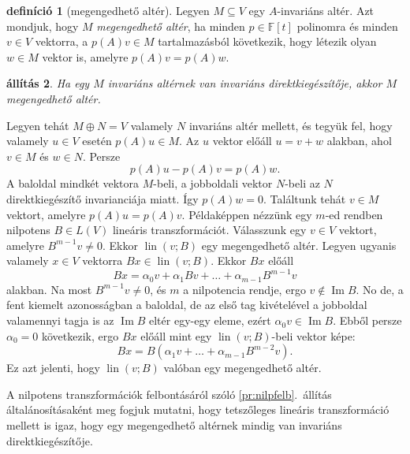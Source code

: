 \documentclass[a4paper, showtrims]{memoir}
\makeatletter
\renewenvironment{proof}[1][\proofname]
    {\par\pushQED{\qed}%
    \normalfont \topsep6\p@\@plus6\p@\relax
    \trivlist
    \item[\hskip\labelsep
        \itshape
    #1\@addpunct{:}]\ignorespaces}
    {\popQED\endtrivlist\@endpefalse}
\theoremstyle{plain}
\newtheorem{proposition}{állítás}[chapter]
\theoremstyle{remark}
\theoremstyle{definition}
\newtheorem{definition}[proposition]{definíció}
\DeclareMathOperator{\lin}{lin}
\DeclareMathOperator{\im}{Im}
\makeatother
\begin{document}
\begin{definition}[megengedhető altér]
    Legyen $M\subseteq V$ egy $A$-invariáns altér.
    Azt mondjuk, hogy $M$ \emph{megengedhető altér},
    ha minden $p\in\mathbb{F}\left[ t \right]$ polinomra és minden $v\in V$ vektorra,
    a $p\left( A \right)v\in M$ tartalmazásból következik, 
    hogy létezik olyan $w\in M$ vektor is, amelyre $p\left( A \right)v=p\left( A \right)w$.
\end{definition}
\begin{proposition}
    Ha egy $M$ invariáns altérnek van invariáns direktkiegészítője, akkor $M$ megengedhető altér.
\end{proposition}
\begin{proof}
    Legyen tehát $M\oplus N=V$ valamely $N$ invariáns altér mellett,
    és tegyük fel, hogy valamely $u\in V$ esetén $p\left( A \right)u\in M$.
    Az $u$ vektor előáll $u=v+w$ alakban, 
    ahol $v\in M$ és $w\in N$.
    Persze
    \[
        p\left( A \right)u-p\left( A \right)v=p\left( A \right)w.
    \]
    A baloldal mindkét vektora $M$-beli, 
    a jobboldali vektor $N$-beli az $N$ direktkiegészítő invarianciája miatt.
    Így $p\left( A \right)w=0$.
    Találtunk tehát $v\in M$ vektort, amelyre $p\left( A \right)u=p\left( A \right)v$.
\end{proof}
Példaképpen nézzünk egy $m$-ed rendben nilpotens 
$B\in L\left( V \right)$ lineáris transzformációt.
Válasszunk egy $v\in V$ vektort, amelyre $B^{m-1}v\neq 0$.
Ekkor $\lin\left( v;B \right)$ egy megengedhető altér.
Legyen ugyanis valamely $x\in V$ vektorra $Bx\in\lin\left( v;B \right)$.
Ekkor $Bx$ előáll
\[
    Bx
    =
    \alpha_0v+\alpha_1Bv+\ldots+\alpha_{m-1}B^{m-1}v
\]
alakban. 
Na most $B^{m-1}v\neq 0$, és $m$ a nilpotencia rendje, ergo $v\notin \im B$. 
No de, a fent kiemelt azonosságban a baloldal,
de az első tag kivételével a jobboldal valamennyi tagja is az $\im B$ eltér egy-egy eleme,
ezért $\alpha_0 v\in\im B$. 
Ebből persze $\alpha_0=0$ következik, 
ergo $Bx$ előáll mint egy $\lin\left( v;B \right)$-beli vektor képe:
\[
    Bx
    =B
    \left( 
    \alpha_1v+\ldots+\alpha_{m-1}B^{m-2}v
    \right).
\]
Ez azt jelenti, hogy $\lin\left(v;B  \right)$ valóban egy megengedhető altér.

A nilpotens transzformációk felbontásáról szóló \ref{pr:nilpfelb}.~állítás általánosításaként meg fogjuk mutatni,
hogy tetszőleges lineáris transzformáció mellett is igaz, 
hogy egy megengedhető altérnek mindig van invariáns direktkiegészítője.
\end{document}
